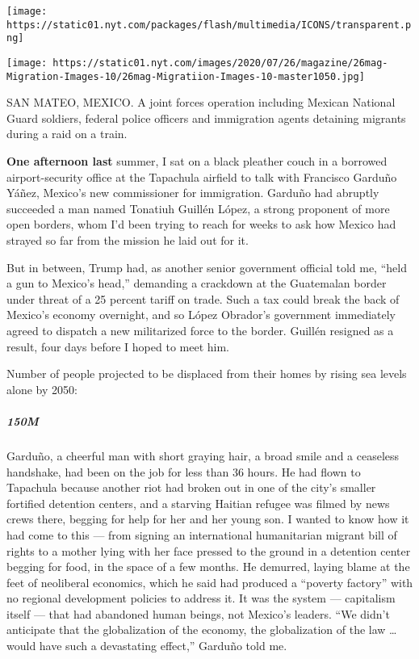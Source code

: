 \texttt{[image: https://static01.nyt.com/packages/flash/multimedia/ICONS/transparent.png]}

\texttt{[image: https://static01.nyt.com/images/2020/07/26/magazine/26mag-Migration-Images-10/26mag-Migratiion-Images-10-master1050.jpg]}

SAN MATEO, MEXICO. A joint forces operation including Mexican National
Guard soldiers, federal police officers and immigration agents detaining
migrants during a raid on a train.

\textbf{One afternoon last} summer, I sat on a black pleather couch in a
borrowed airport-security office at the Tapachula airfield to talk with
Francisco Garduño Yáñez, Mexico's new commissioner for immigration.
Garduño had abruptly succeeded a man named Tonatiuh Guillén López, a
strong proponent of more open borders, whom I'd been trying to reach for
weeks to ask how Mexico had strayed so far from the mission he laid out
for it.

But in between, Trump had, as another senior government official told
me, ``held a gun to Mexico's head,'' demanding a crackdown at the
Guatemalan border under threat of a 25 percent tariff on trade. Such a
tax could break the back of Mexico's economy overnight, and so López
Obrador's government immediately agreed to dispatch a new militarized
force to the border. Guillén resigned as a result, four days before I
hoped to meet him.

Number of people projected to be displaced from their homes by rising
sea levels alone by 2050:

\hypertarget{150m}{%
\subparagraph{150M}\label{150m}}

Garduño, a cheerful man with short graying hair, a broad smile and a
ceaseless handshake, had been on the job for less than 36 hours. He had
flown to Tapachula because another riot had broken out in one of the
city's smaller fortified detention centers, and a starving Haitian
refugee was filmed by news crews there, begging for help for her and her
young son. I wanted to know how it had come to this --- from signing an
international humanitarian migrant bill of rights to a mother lying with
her face pressed to the ground in a detention center begging for food,
in the space of a few months. He demurred, laying blame at the feet of
neoliberal economics, which he said had produced a ``poverty factory''
with no regional development policies to address it. It was the system
--- capitalism itself --- that had abandoned human beings, not Mexico's
leaders. ``We didn't anticipate that the globalization of the economy,
the globalization of the law \ldots{} would have such a devastating
effect,'' Garduño told me.

